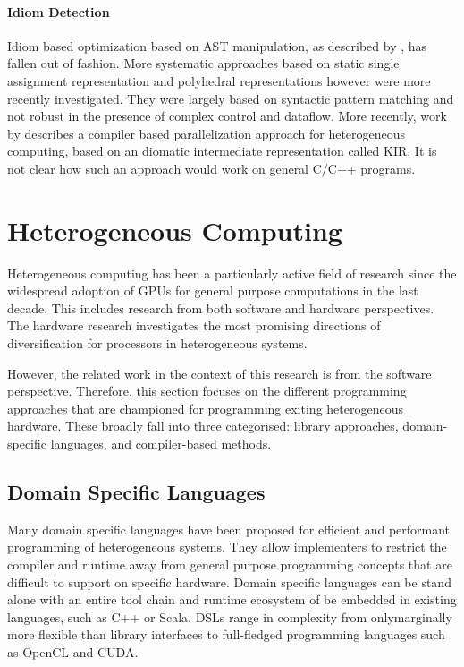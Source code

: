 \paragraph*{Idiom Detection}
    Idiom based optimization based on AST manipulation, as described by
    \citet{Pinter:1994:POP:177492.177494}, has fallen out of fashion.
    More systematic approaches based on static single assignment representation
    \cite{lattner2004llvm} and polyhedral representations
    \cite{benabderrahmane2010polyhedral} however were more recently
    investigated.
    They were largely based on syntactic pattern matching and not robust in the
    presence of complex control and dataflow.
    More recently, work by \citet{Andion2015Compilation} describes a compiler
    based parallelization approach for heterogeneous computing, based on an
    diomatic intermediate representation called KIR.  
    It is not clear how such an approach would work on general C/C++ programs.

\pagebreak
\section{Heterogeneous Computing}

    Heterogeneous computing has been a particularly active field of research
    since the widespread adoption of GPUs for general purpose computations in
    the last decade.
    This includes research from both software and hardware perspectives.
    The hardware research investigates the most promising directions of
    diversification for processors in heterogeneous systems.
    
    However, the related work in the context of this research is from
    the software perspective.
    Therefore, this section focuses on the different programming approaches that
    are championed for programming exiting heterogeneous hardware.
    These broadly fall into three categorised: library approaches,
    domain-specific languages, and compiler-based methods.

\subsection{Domain Specific Languages}

    Many domain specific languages have been proposed for efficient and
    performant programming of heterogeneous systems.
    They allow implementers to restrict the compiler and runtime away from
    general purpose programming concepts that are difficult to support on
    specific hardware.
    Domain specific languages can be stand alone with an entire tool chain and
    runtime ecosystem of be embedded in existing languages, such as C++ or
    Scala.
    DSLs range in complexity from onlymarginally more flexible than library
    interfaces to full-fledged programming languages such as OpenCL and CUDA.

